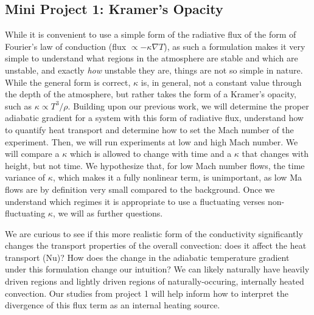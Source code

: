 \documentclass[aasms,12pt]{article}
\newcommand{\grad}{\ensuremath{\nabla}}
\begin{document}
\subsection{Mini Project 1: Kramer's Opacity}
While it is convenient to use a simple form of the radiative flux of the form of
Fourier's law of conduction \cite{lecoanet&all2014} (flux $\propto -\kappa \grad T$), as such a formulation
makes it very simple to understand what regions in the atmosphere are stable and which
are unstable, and exactly \emph{how} unstable they are, things are not so simple in nature.
While the general form is correct, $\kappa$ is, in general, not a constant value through the
depth of the atmosphere, but rather takes the form of a Kramer's opacity, such as 
$\kappa \propto T^3 / \rho$. Building upon our previous work, we will determine the proper
adiabatic gradient for a system with this form of radiative flux, understand how to quantify
heat transport and determine how to set the Mach number of the experiment.  Then, we will run experiments 
at low and high Mach number.  We will compare a $\kappa$ which is allowed to change with time
and a $\kappa$ that changes with height, but not time.  We hypothesize that, for low Mach number
flows, the time variance of $\kappa$, which makes it a fully nonlinear term, is unimportant, as
low Ma flows are by definition very small compared to the background.  Once we understand which
regimes it is appropriate to use a fluctuating verses non-fluctuating $\kappa$, we will
as further questions.

We are curious to see if this more realistic form of the conductivity significantly changes
the transport properties of the overall convection: does it affect the heat transport
(Nu)?  How does the change in the adiabatic temperature gradient under this formulation
change our intuition?  We can likely naturally have heavily driven regions and lightly
driven regions of naturally-occuring, internally heated convection.  Our studies from project
1 will help inform how to interpret the divergence of this flux term as an internal heating
source.
\end{document}
